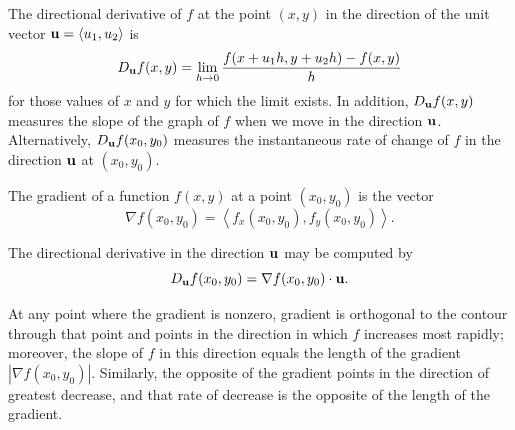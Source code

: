 \begin{summary}

\item The directional derivative of $f$ at the point $(x,y)$ in the direction of the unit vector $\mathbf{u} = \langle u_1, u_2 \rangle$ is 
\begin{equation*}
D_{\mathbf{u}}f(x,y) = \lim_{h \to 0} \frac{f(x+u_1h, y+u_2h) - f(x,y)}{h}
\end{equation*}
for those values of $x$ and $y$ for which the limit exists.  In addition, $D_{\mathbf{u}}f(x,y)$ measures the slope of the graph of $f$ when we move in the direction
  $\mathbf{u}$.   Alternatively, $D_{\mathbf{u}} f(x_0,y_0)$ measures the instantaneous rate of change of $f$ in the direction $\mathbf{u}$ at $(x_0,y_0)$.

\item The gradient of a function $f(x,y)$ at a point $(x_0,y_0)$ is
  the vector
  $$
  \nabla f(x_0,y_0) = \left\langle f_x(x_0,y_0),
    f_y(x_0,y_0)\right\rangle.
  $$

\item The directional derivative in the direction $\mathbf{u}$ may be computed by
  $$D_{\mathbf{u}}f(x_0,y_0) = \nabla f(x_0,y_0)\cdot \mathbf{u}.
  $$
  

\item At any point where the gradient is nonzero,  gradient is orthogonal to the contour through
  that point and points in the direction in which $f$ increases most
  rapidly; moreover, the slope of $f$ in this direction equals the length of the
  gradient $|\nabla f(x_0,y_0)|$.  Similarly, the opposite of the gradient points in the direction of greatest decrease, and that rate of decrease is the opposite of the length of the gradient.
\end{summary}





\nin \hrulefill



\clearpage
